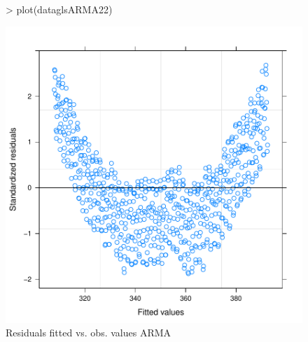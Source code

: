 \documentclass[11pt, a4paper]{article} %
\begin{document}
\begin{figure}[H]
\centering
\begin{Schunk}
\begin{Sinput}
> plot(dataglsARMA22)
\end{Sinput}
\end{Schunk}
\includegraphics{alleselena-043}
\caption{Residuals fitted vs. obs. values ARMA}
\label{comparison_finalgls2}
\end{figure}
\end{document}
